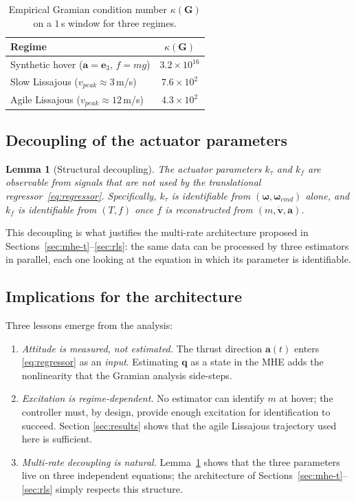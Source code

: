 \documentclass[lettersize,journal]{IEEEtran}
\newtheorem{lemma}{Lemma}
\newcommand{\vect}[1]{\bm{#1}}
\newcommand{\mat}[1]{\mathbf{#1}}
\begin{document}
\begin{table}[t]
\centering
\caption{Empirical Gramian condition number $\kappa(\mat G)$ on
a $1$\,s window for three regimes.}
\label{tab:gramian}
\begin{tabular}{lc}
\toprule
Regime & $\kappa(\mat G)$ \\
\midrule
Synthetic hover ($\vect a=\vect e_3,\,f=mg$) & $3.2\times10^{16}$ \\
Slow Lissajous ($v_{peak}\!\approx\!3$\,m/s) & $7.6\times10^{2}$ \\
Agile Lissajous ($v_{peak}\!\approx\!12$\,m/s) & $4.3\times10^{2}$ \\
\bottomrule
\end{tabular}
\end{table}

\subsection{Decoupling of the actuator parameters}
\begin{lemma}[Structural decoupling]\label{lem:decoup}
The actuator parameters $k_\tau$ and $k_f$ are observable from
signals that are not used by the translational
regressor~\eqref{eq:regressor}.  Specifically, $k_\tau$ is
identifiable from $(\vect\omega,\vect\omega_{cmd})$ alone, and
$k_f$ is identifiable from $(T,f)$ once $f$ is reconstructed from
$(m,\dot{\vect v},\vect a)$.
\end{lemma}
\noindent This decoupling is what justifies the multi-rate
architecture proposed in Sections~\ref{sec:mhe-t}--\ref{sec:rls}:
the same data can be processed by three estimators in parallel,
each one looking at the equation in which its parameter is
identifiable.

\subsection{Implications for the architecture}
Three lessons emerge from the analysis:
\begin{enumerate}
\item \emph{Attitude is measured, not estimated.}  The thrust
direction $\vect a(t)$ enters \eqref{eq:regressor} as an
\emph{input}.  Estimating $\vect q$ as a state in the MHE adds
the nonlinearity that the Gramian analysis side-steps.
\item \emph{Excitation is regime-dependent.}  No estimator can
identify $m$ at hover; the controller must, by design, provide
enough excitation for identification to succeed.  Section
\ref{sec:results} shows that the agile Lissajous trajectory used
here is sufficient.
\item \emph{Multi-rate decoupling is natural.}
Lemma~\ref{lem:decoup} shows that the three parameters live on
three independent equations; the architecture of
Sections~\ref{sec:mhe-t}--\ref{sec:rls} simply respects this
structure.
\end{enumerate}
\end{document}
